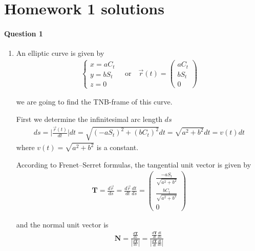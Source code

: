 \documentclass[11pt,a4paper]{article}
\author{Zehao Gao}
\begin{document}
\section*{Homework 1 solutions}

\paragraph{Question 1}

\begin{enumerate}

\item[]

An elliptic curve is given by
\begin{align}
\left\{
\begin{array}{lcl}
x=a C_t \\
y=b S_t \\
z=0
\end{array}
\right.
\hspace{1em}
\mbox{or}
\hspace{1em}
\vec{r}(t)=
\begin{pmatrix}
a C_t \\
b S_t \\
0
\end{pmatrix}
\end{align}

we are going to find the TNB-frame of this curve.

First we determine the infinitesimal arc length $ds$
\begin{align}
ds
=\Big|\frac{\vec{r}(t)}{dt}\Big|dt
=\sqrt{(-a S_t)^2+(b C_t)^2}dt
=\sqrt{a^2+b^2}dt
=v(t)dt
\end{align}
where $v(t)=\sqrt{a^2+b^2}$ is a constant.

According to Frenet–Serret formulas, the tangential unit vector is given by
\begin{align}
\mathbf{T}
=\frac{d\vec{r}}{ds}
=\frac{d\vec{r}}{dt}\frac{dt}{ds}
=
\begin{pmatrix}
\frac{-a S_t}{\sqrt{a^2+b^2}} \\
\frac{b C_t}{\sqrt{a^2+b^2}} \\
0
\end{pmatrix}
\end{align}

and the normal unit vector is
\begin{align}
\mathbf{N}
=\frac{\frac{d\mathbf{T}}{ds}}{|\frac{d\mathbf{T}}{ds}|}
=\frac{\frac{d\mathbf{T}}{dt}\frac{dt}{ds}}{|\frac{d\mathbf{T}}{dt}\frac{dt}{ds}|}
\end{align}


\end{enumerate}
\end{document}
